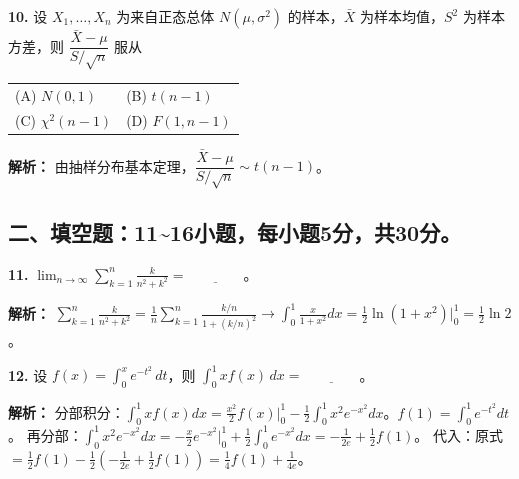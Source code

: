 \vspace{8pt}

\textbf{10.} 设 $X_1,\ldots,X_n$ 为来自正态总体 $N(\mu,\sigma^2)$ 的样本，$\bar{X}$ 为样本均值，$S^2$ 为样本方差，则 $\dfrac{\bar{X} - \mu}{S/\sqrt{n}}$ 服从
\begin{center}
\begin{tabular}{ll}
(A) $N(0,1)$ & (B) $t(n-1)$ \\[6pt]
(C) $\chi^2(n-1)$ & (D) $F(1,n-1)$
\end{tabular}
\end{center}

\ifshowsolutions\par\noindent\textbf{解析：} 由抽样分布基本定理，$\dfrac{\bar{X}-\mu}{S/\sqrt{n}}\sim t(n-1)$。\else \answerarea \fi

\newpage

\subsection*{二、填空题：11\textasciitilde16小题，每小题5分，共30分。}

\textbf{11.} $\displaystyle\lim_{n \to \infty} \sum_{k=1}^{n} \frac{k}{n^2 + k^2} = \underline{\qquad\qquad}$。

\ifshowsolutions\par\noindent\textbf{解析：} $\displaystyle\sum_{k=1}^{n} \frac{k}{n^2+k^2} = \frac{1}{n}\sum_{k=1}^{n} \frac{k/n}{1+(k/n)^2} \to \int_{0}^{1} \frac{x}{1+x^2}dx = \frac{1}{2}\ln(1+x^2)\big|_{0}^{1} = \frac{1}{2}\ln 2$。
\else \answerarea \fi

\vspace{8pt}

\textbf{12.} 设 $f(x) = \displaystyle\int_{0}^{x} e^{-t^2}\,dt$，则 $\displaystyle\int_{0}^{1} x f(x)\,dx = \underline{\qquad\qquad}$。

\ifshowsolutions\par\noindent\textbf{解析：} 分部积分：$\int_{0}^{1} x f(x)dx = \frac{x^2}{2}f(x)\big|_{0}^{1} - \frac{1}{2}\int_{0}^{1} x^2 e^{-x^2}dx$。$f(1)=\int_{0}^{1}e^{-t^2}dt$。
再分部：$\int_{0}^{1} x^2 e^{-x^2}dx = -\frac{x}{2}e^{-x^2}\big|_{0}^{1} + \frac{1}{2}\int_{0}^{1} e^{-x^2}dx = -\frac{1}{2e} + \frac{1}{2}f(1)$。
代入：原式 $= \frac{1}{2}f(1) - \frac{1}{2}(-\frac{1}{2e}+\frac{1}{2}f(1)) = \frac{1}{4}f(1) + \frac{1}{4e}$。
\else \answerarea \fi

